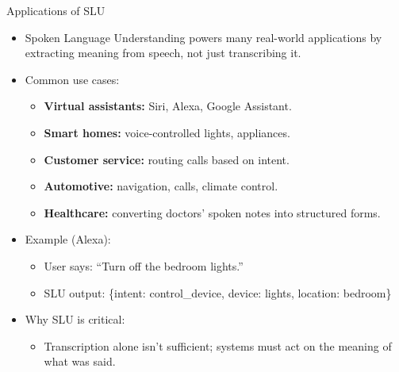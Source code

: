 \begin{frame}[allowframebreaks]{Applications of SLU}

\begin{itemize}
    \item Spoken Language Understanding powers many real-world applications by extracting meaning from speech, not just transcribing it.

    \item Common use cases:
    \begin{itemize}
        \item \textbf{Virtual assistants:} Siri, Alexa, Google Assistant.
        \item \textbf{Smart homes:} voice-controlled lights, appliances.
        \item \textbf{Customer service:} routing calls based on intent.
        \item \textbf{Automotive:} navigation, calls, climate control.
        \item \textbf{Healthcare:} converting doctors’ spoken notes into structured forms.
    \end{itemize}
\framebreak
    \item Example (Alexa):
    \begin{itemize}
        \item User says: ``Turn off the bedroom lights.''  
        \item SLU output: \{intent: control\_device, device: lights, location: bedroom\}
    \end{itemize}

    \item Why SLU is critical:
    \begin{itemize}
        \item Transcription alone isn’t sufficient; systems must act on the meaning of what was said.
    \end{itemize}
\end{itemize}

\end{frame}
